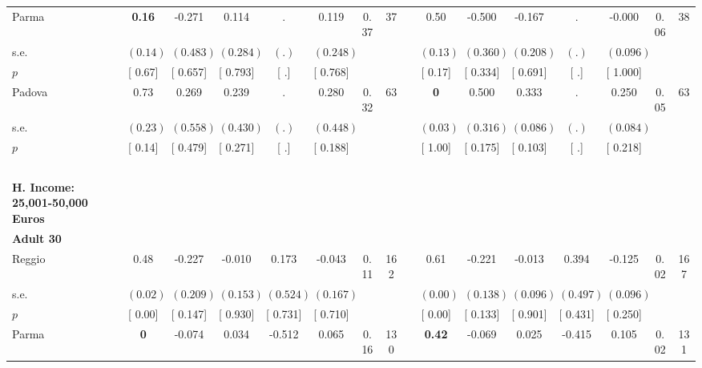 \begin{longtable}{L{8em} c c c c c c c p{1em} c c c c c c c}
\quad \quad \quad Parma& \textbf{     0.16} &    -0.271 &     0.114 &         . &     0.119 &      0.37 &        37 & & 0.50 &    -0.500 &    -0.167 &         . &    -0.000 &      0.06 &        38  \\*
\quad \quad \quad \quad s.e.& $ (     0.14)$ & $ (    0.483)$ & $ (    0.284)$ & $ (        .)$ & $ (    0.248)$ & & & & $ (     0.13)$ & $ (    0.360)$ & $ (    0.208)$ & $ (        .)$ & $ (    0.096)$ & &  \\*
\quad \quad \quad \quad $ p$ & [     0.67] & [    0.657] & [    0.793] & [        .] & [    0.768] & & & & [     0.17] & [    0.334] & [    0.691] & [        .] & [    1.000] & &  \\[1em]
\quad \quad \quad Padova& 0.73 &     0.269 &     0.239 &         . &     0.280 &      0.32 &        63 & & \textbf{0} &     0.500 &     0.333 &         . &     0.250 &      0.05 &        63  \\*
\quad \quad \quad \quad s.e.& $ (     0.23)$ & $ (    0.558)$ & $ (    0.430)$ & $ (        .)$ & $ (    0.448)$ & & & & $ (     0.03)$ & $ (    0.316)$ & $ (    0.086)$ & $ (        .)$ & $ (    0.084)$ & &  \\*
\quad \quad \quad \quad $ p$ & [     0.14] & [    0.479] & [    0.271] & [        .] & [    0.188] & & & & [     1.00] & [    0.175] & [    0.103] & [        .] & [    0.218] & &  \\[1em]
~\\[1em]
\textbf{H. Income: 25,001-50,000 Euros} \\*
\quad \quad \textbf{Adult 30} & & & & & & & & & & & & & & & \\* 
\quad \quad \quad Reggio& 0.48 &    -0.227 &    -0.010 &     0.173 &    -0.043 &      0.11 &       162 & & 0.61 &    -0.221 &    -0.013 &     0.394 &    -0.125 &      0.02 &       167  \\*
\quad \quad \quad \quad s.e.& $ (     0.02)$ & $ (    0.209)$ & $ (    0.153)$ & $ (    0.524)$ & $ (    0.167)$ & & & & $ (     0.00)$ & $ (    0.138)$ & $ (    0.096)$ & $ (    0.497)$ & $ (    0.096)$ & &  \\*
\quad \quad \quad \quad $ p$ & [     0.00] & [    0.147] & [    0.930] & [    0.731] & [    0.710] & & & & [     0.00] & [    0.133] & [    0.901] & [    0.431] & [    0.250] & &  \\[1em]
\quad \quad \quad Parma& \textbf{0} &    -0.074 &     0.034 &    -0.512 &     0.065 &      0.16 &       130 & & \textbf{     0.42} &    -0.069 &     0.025 &    -0.415 &     0.105 &      0.02 &       131  \\*

\end{longtable}
